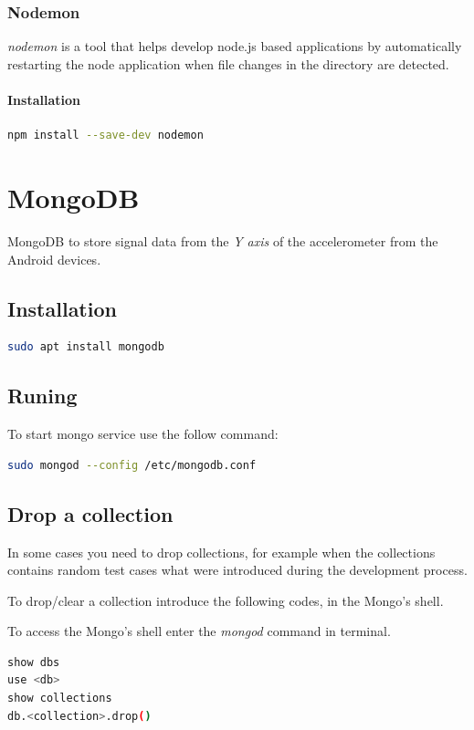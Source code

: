 \documentclass[12pt, a4paper, portrait]{article}
\begin{document}
\subsubsection{Nodemon}
\textit{nodemon} is a tool that helps develop node.js based applications by automatically restarting the node application when file changes in the directory are detected.
\paragraph{Installation}
\begin{lstlisting}[language=bash]
npm install --save-dev nodemon
\end{lstlisting}

\pagebreak
\section{MongoDB}
MongoDB to store signal data from the \textit{Y axis} of the accelerometer from the Android devices.
\subsection{Installation}
\begin{lstlisting}[language=bash]
sudo apt install mongodb
\end{lstlisting}
\subsection{Runing}
To start mongo service use the follow command:
\begin{lstlisting}[language=bash]
sudo mongod --config /etc/mongodb.conf 
\end{lstlisting}
\subsection{Drop a collection}
In some cases you need to drop collections, for example when the collections contains random test cases what were introduced during the development process.
\par To drop/clear a collection introduce the following codes, in the Mongo's shell.
\par To access the Mongo's shell enter the \textit{mongod} command in terminal.
\begin{lstlisting}[language=bash, caption=MongoDB shell commands to drop a collection]
show dbs
use <db>
show collections
db.<collection>.drop()
\end{lstlisting}
\end{document}
